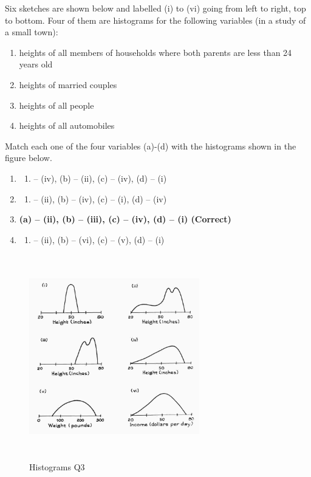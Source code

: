 \documentclass[letterpaper,10pt,twoside,printwatermark=false]{pinp}
\providecommand{\tightlist}{%
  \setlength{\itemsep}{0pt}\setlength{\parskip}{0pt}}
\begin{document}
Six sketches are shown below and labelled (i) to (vi) going from left to
right, top to bottom. Four of them are histograms for the following
variables (in a study of a small town):

\begin{enumerate}
\def\labelenumi{\alph{enumi})}
\tightlist
\item
  heights of all members of households where both parents are less than
  24 years old
\item
  heights of married couples
\item
  heights of all people
\item
  heights of all automobiles
\end{enumerate}

Match each one of the four variables (a)-(d) with the histograms shown
in the figure below.

\begin{enumerate}
\def\labelenumi{\alph{enumi})}
\item
  \begin{enumerate}
  \def\labelenumii{(\alph{enumii})}
  \tightlist
  \item
    -- (iv), (b) -- (ii), (c) -- (iv), (d) -- (i)
  \end{enumerate}
\item
  \begin{enumerate}
  \def\labelenumii{(\alph{enumii})}
  \tightlist
  \item
    -- (ii), (b) -- (iv), (c) -- (i), (d) -- (iv)
  \end{enumerate}
\item
  \textbf{(a) -- (ii), (b) -- (iii), (c) -- (iv), (d) -- (i) (Correct)}
\item
  \begin{enumerate}
  \def\labelenumii{(\alph{enumii})}
  \tightlist
  \item
    -- (ii), (b) -- (vi), (c) -- (v), (d) -- (i)
  \end{enumerate}
\end{enumerate}

\begin{figure}[H]
  \begin{center}
    \includegraphics[width=0.66\textwidth, height=3.5in]{hist_q3.jpg} 
  \end{center}
  \caption{Histograms Q3}\label{fig}
\end{figure}
\end{document}
